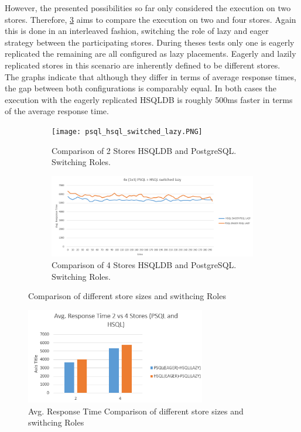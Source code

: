 However, the presented possibilities so far only considered the execution on two stores. Therefore, \ref{fig:24storecomp} aims
to compare the execution on two and four stores. Again this is done in an interleaved fashion, switching the role of lazy and eager strategy between the participating stores.
During theses tests only one is eagerly replicated the remaining are all configured as lazy placements. Eagerly and lazily replicated stores in this scenario are inherently
defined to be different stores.\\
The graphs indicate that although they differ in terms of average response times, the gap between both configurations is comparably equal.
In both cases the execution with the eagerly replicated HSQLDB is roughly 500ms faster in terms of the average response time.\\


\begin{figure}
    \centering
    \begin{subfigure}{.5\textwidth}
      \centering
      \texttt{[image: psql\_hsql\_switched\_lazy.PNG]}
      \caption{Comparison of 2 Stores HSQLDB and PostgreSQL. Switching Roles.}
      \label{fig:2store}
    \end{subfigure}%
    \begin{subfigure}{.5\textwidth}
      \centering
      \includegraphics[width=.9\linewidth]{Figures/4psql_hsql_switched_lazy.PNG}
      \caption{Comparison of 4 Stores HSQLDB and PostgreSQL. Switching Roles.}
      \label{fig:4store}
    \end{subfigure}
    \caption{Comparison of different store sizes and swithcing Roles}
    \label{fig:24storecomp}
\end{figure}


\begin{figure}[t] 
    \centering 
    \includegraphics[width=0.7\textwidth]{Figures/24_avg_psql_hsql_switched_lazy.PNG}
    \caption{Avg. Response Time Comparison of different store sizes and swithcing Roles}
    \label{fig:24storecomp_avg}
\end{figure}


